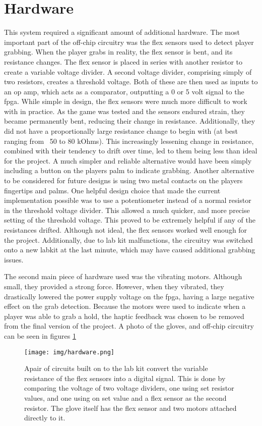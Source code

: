 \section{Hardware}
\label{sec:hardware}

This system required a significant amount of additional hardware. The most
important part of the off-chip circuitry was the flex sensors used to detect
player grabbing. When the player grabs in reality, the flex sensor is bent, and
its resistance changes. The flex sensor is placed in series with another
resistor to create a variable voltage divider. A second voltage divider,
comprising simply of two resistors, creates a threshold voltage. Both of these
are then used as inputs to an op amp, which acts as a comparator, outputting a 0
or 5 volt signal to the fpga. While simple in design, the flex sensors were much
more difficult to work with in practice. As the game was tested and the sensors
endured strain, they became permanently bent, reducing their change in
resistance. Additionally, they did not have a proportionally large resistance
change to begin with (at best ranging from ~50 to 80 kOhms). This increasingly
lessening change in resistance, combined with their tendency to drift over time,
led to them being less than ideal for the project. A much simpler and reliable
alternative would have been simply including a button on the players palm to
indicate grabbing. Another alternative to be considered for future designs is
using two metal contacts on the players fingertips and palms. One helpful design
choice that made the current implementation possible was to use a potentiometer
instead of a normal resistor in the threshold voltage divider. This allowed a
much quicker, and more precise setting of the threshold voltage. This proved to
be extremely helpful if any of the resistances drifted. Although not ideal, the
flex sensors worked well enough for the project. Additionally, due to lab kit
malfunctions, the circuitry was switched onto a new labkit at the last minute,
which may have caused additional grabbing issues.

The second main piece of hardware used was the vibrating motors. Although small,
they provided a strong force. However, when they vibrated, they drastically
lowered the power supply voltage on the fpga, having a large negative effect on
the grab detection. Because the motors were used to indicate when a player was
able to grab a hold, the haptic feedback was chosen to be removed from the final
version of the project. A photo of the gloves, and off-chip circuitry can be
seen in figures \ref{fig:hardware}

\begin{figure}[h]
\centering
\texttt{[image: img/hardware.png]}
\caption{Apair of circuits built on to the lab kit convert the variable
resistance of the flex sensors into a digital signal. This is done by comparing
the voltage of two voltage dividers, one using set resistor values, and one
using on set value and a flex sensor as the second resistor. The glove itself
has the flex sensor and two motors attached directly to it.}
\label{fig:hardware}
\end{figure}
